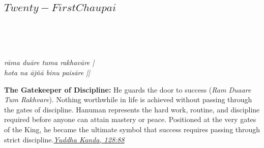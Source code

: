 
\newpage

\subsection*{ \(Twenty-First Chaupai\)}

\begin{minipage}[t]{0.55\textwidth}
\vspace{0pt}

{\large \linespread{1.5}\selectfont
{}\\
\par}

\vspace{0.5em}

{\large \linespread{1.5}\selectfont
{}\\
\par}

\vspace{0.5em}

{\large \linespread{1.3}\selectfont
\textit{rāma duāre tuma rakhavāre |}\\
\textit{hota na ājñā binu paisāre ||}
\par}
\end{minipage}%
\hfill
\begin{minipage}[t]{0.42\textwidth}
\vspace{0pt}
\begin{tcolorbox}[anchorbox]
\textbf{The Gatekeeper of Discipline:} He guards the door to success (\textit{Ram Duaare Tum Rakhvare}). Nothing worthwhile in life is achieved without passing through the gates of discipline. Hanuman represents the hard work, routine, and discipline required before anyone can attain mastery or peace.
\vspace{0.5em}\newline Positioned at the very gates of the King, he became the ultimate symbol that success requires passing through strict discipline.\newline\null\hfill\href{https://www.valmiki.iitk.ac.in/sloka?field_kanda_tid=6&language=dv&field_sarga_value=128}{\textit{Yuddha Kanda, 128:88}}
\end{tcolorbox}
\end{minipage}

